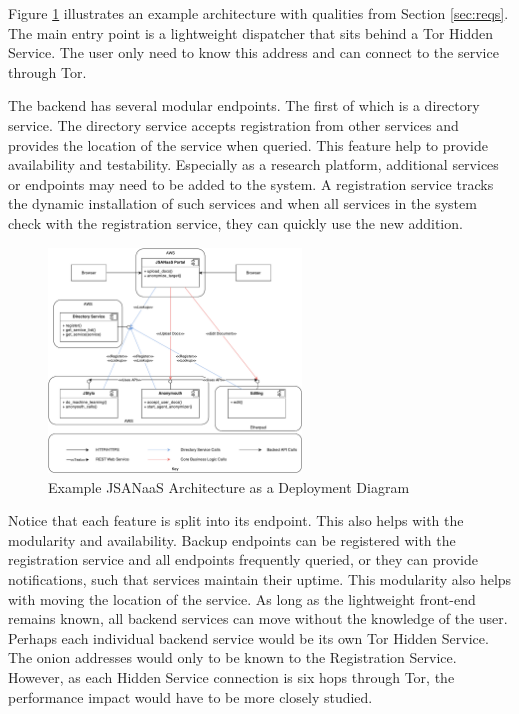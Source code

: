 \documentclass[letterpaper]{article}
\begin{document}
Figure \ref{fig:jsanaas} illustrates an example architecture with
qualities from Section \ref{sec:reqs}.  The main entry point is a
lightweight dispatcher that sits behind a Tor Hidden Service.  The
user only need to know this address and can connect to the service
through Tor.

The backend has several modular endpoints.  The first of which is a
directory service.  The directory service accepts registration from
other services and provides the location of the service when
queried.  This feature help to provide availability and testability.
Especially as a research platform, additional services or endpoints
may need to be added to the system.  A registration service tracks the
dynamic installation of such services and when all services in the
system check with the registration service, they can quickly use the
new addition.

\begin{figure}
  \centering
    \includegraphics[width=0.6\textwidth]{img/jsanaas.pdf}
  \caption{Example JSANaaS Architecture as a Deployment Diagram}
  \label{fig:jsanaas}
\end{figure}

Notice that each feature is split into its endpoint.  This also helps
with the modularity and availability.  Backup endpoints can be
registered with the registration service and all endpoints frequently
queried, or they can provide notifications, such that services
maintain their uptime.  This modularity also helps with moving the
location of the service.  As long as the lightweight front-end remains
known, all backend services can move without the knowledge of the
user.  Perhaps each individual backend service would be its own Tor
Hidden Service.  The onion addresses would only to be known to the
Registration Service.  However, as each Hidden Service connection is
six hops through Tor, the performance impact would have to be more
closely studied.
\end{document}

